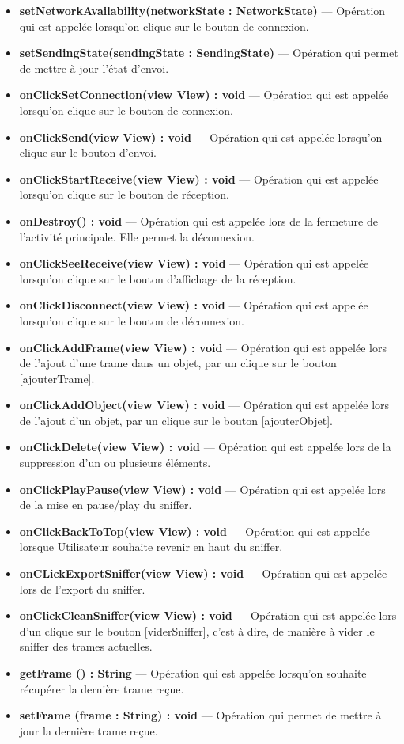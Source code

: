 \begin{itemize}
    \item \textbf{setNetworkAvailability(networkState : NetworkState)}  --- Opération qui est appelée lorsqu'on clique sur le bouton de connexion.
    \item \textbf{setSendingState(sendingState : SendingState)}  --- Opération qui permet de mettre à jour l'état d'envoi.
    \item \textbf{onClickSetConnection(view View) : void}  --- Opération qui est appelée lorsqu'on clique sur le bouton de connexion.
    \item \textbf{onClickSend(view View) : void}  --- Opération qui est appelée lorsqu'on clique sur le bouton d'envoi.
    \item \textbf{onClickStartReceive(view View) : void}  --- Opération qui est appelée lorsqu'on clique sur le bouton de réception.
    \item \textbf{onDestroy() : void}  --- Opération qui est appelée lors de la fermeture de l'activité principale. Elle permet la déconnexion. 
    \item \textbf{onClickSeeReceive(view View) : void}  --- Opération qui est appelée lorsqu'on clique sur le bouton d'affichage de la réception.
    \item \textbf{onClickDisconnect(view View) : void}  --- Opération qui est appelée lorsqu'on clique sur le bouton de déconnexion.
    \item \textbf{onClickAddFrame(view View) : void}  --- Opération qui est appelée lors de l'ajout d'une trame dans un objet, par un clique sur le bouton [ajouterTrame].
    \item \textbf{onClickAddObject(view View) : void}  --- Opération qui est appelée lors de l'ajout d'un objet, par un clique sur le bouton [ajouterObjet].
    \item \textbf{onClickDelete(view View) : void}  --- Opération qui est appelée lors de la suppression d'un ou plusieurs éléments. 
    \item \textbf{onClickPlayPause(view View) : void}  --- Opération qui est appelée lors de la mise en pause/play du sniffer. 
    \item \textbf{onClickBackToTop(view View) : void}  --- Opération qui est appelée lorsque Utilisateur souhaite revenir en haut du sniffer.
    \item \textbf{onCLickExportSniffer(view View) : void}  --- Opération qui est appelée lors de l'export du sniffer. 
    \item \textbf{onClickCleanSniffer(view View) : void}  --- Opération qui est appelée lors d'un clique sur le bouton [viderSniffer], c'est à dire, de manière à vider le sniffer des trames actuelles.
    \item \textbf{getFrame () : String}  --- Opération qui est appelée lorsqu'on souhaite récupérer la dernière trame reçue.
    \item \textbf{setFrame (frame : String) : void}  --- Opération qui permet de mettre à jour la dernière trame reçue. 
   
\end{itemize}
